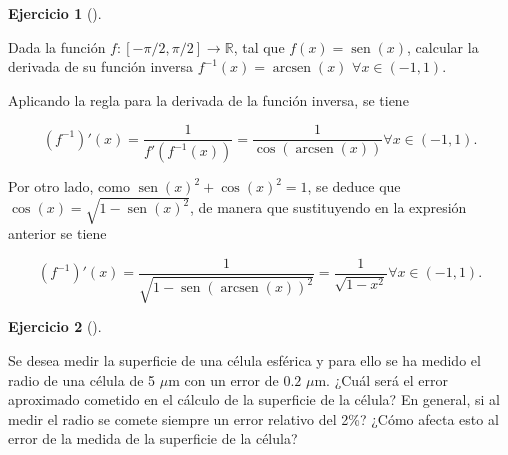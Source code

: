 \documentclass[
  spanish,
  a4paper,
]{scrreport}
\theoremstyle{definition}
\newtheorem{exercise}{Ejercicio}[chapter]
\theoremstyle{remark}
\begin{document}
\begin{exercise}[]\protect\hypertarget{exr-inversa-seno}{}\label{exr-inversa-seno}

Dada la función \(f:[-\pi/2, \pi/2]\to \mathbb{R}\), tal que
\(f(x)=\operatorname{sen}(x)\), calcular la derivada de su función
inversa \(f^{-1}(x) = \operatorname{arcsen}(x)\)
\(\forall x\in (-1,1)\).

\end{exercise}

\begin{tcolorbox}[enhanced jigsaw, arc=.35mm, bottomrule=.15mm, bottomtitle=1mm, breakable, colback=white, colbacktitle=quarto-callout-tip-color!10!white, colframe=quarto-callout-tip-color-frame, coltitle=black, left=2mm, leftrule=.75mm, opacityback=0, opacitybacktitle=0.6, rightrule=.15mm, title=\textcolor{quarto-callout-tip-color}{\faLightbulb}\hspace{0.5em}{Solución}, titlerule=0mm, toprule=.15mm, toptitle=1mm]

Aplicando la regla para la derivada de la función inversa, se tiene

\[
(f^{-1})'(x) = \frac{1}{f'(f^{-1}(x))} = \frac{1}{\cos(\operatorname{arcsen}(x))} \forall x\in (-1,1).
\]

Por otro lado, como \(\operatorname{sen}(x)^2+\cos(x)^2=1\), se deduce
que \(\cos(x) = \sqrt{1-\operatorname{sen}(x)^2}\), de manera que
sustituyendo en la expresión anterior se tiene

\[
(f^{-1})'(x) = \frac{1}{\sqrt{1-\operatorname{sen}(\operatorname{arcsen}(x))^2}} = \frac{1}{\sqrt{1-x^2}} \forall x\in (-1,1).
\]

\end{tcolorbox}

\begin{exercise}[]\protect\hypertarget{exr-transmision-errores-1}{}\label{exr-transmision-errores-1}

Se desea medir la superficie de una célula esférica y para ello se ha
medido el radio de una célula de 5 \(\mu\)m con un error de \(0.2\)
\(\mu\)m. ¿Cuál será el error aproximado cometido en el cálculo de la
superficie de la célula? En general, si al medir el radio se comete
siempre un error relativo del 2\%? ¿Cómo afecta esto al error de la
medida de la superficie de la célula?

\end{exercise}
\end{document}
